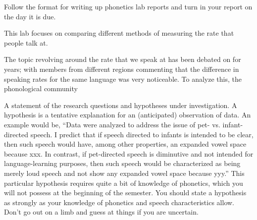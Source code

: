 \documentclass[lab=1,title={Speaking rate},turnin=false]{com310lab}
\begin{document}
\begin{writeup}
	Follow the format for writing up phonetics lab reports and turn in your report on the day it is due.
\end{writeup}

\pagebreak

\labtitle

\begin{topic}
	This lab focuses on comparing different methods of measuring the rate that people talk at.
\end{topic}

\begin{issue}%
	The topic revolving around the rate that we speak at has been debated on for years; with members from different regions commenting that the difference in speaking rates for the same language was very noticeable. To analyze this, the phonological%
	community
\end{issue}

\begin{hypothesis}%
	A statement of the research questions and hypotheses under investigation.
	A hypothesis is a tentative explanation for an (anticipated) observation of data.
	An example would be, ``Data were analyzed to address the issue of pet- vs. infant-directed speech.
	I predict that if speech directed to infants is intended to be clear, then such speech would have, among other properties, an expanded vowel space because xxx.
	In contrast, if pet-directed speech is diminutive and not intended for language-learning purposes, then such speech would be characterized as being merely loud speech and not show any expanded vowel space because yyy.''
	This particular hypothesis requires quite a bit of knowledge of phonetics, which you will not possess at the beginning of the semester.
	You should state a hypothesis as strongly as your knowledge of phonetics and speech characteristics allow.
	Don’t go out on a limb and guess at things if you are uncertain.
\end{hypothesis}
\end{document}
